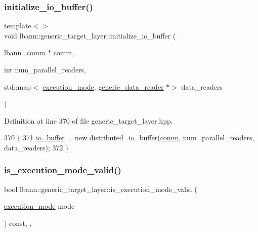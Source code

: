 \subsubsection{\texorpdfstring{initialize\+\_\+io\+\_\+buffer()}{initialize\_io\_buffer()}\hspace{0.1cm}{\footnotesize\ttfamily [3/3]}}
{\footnotesize\ttfamily template$<$$>$ \\
void lbann\+::generic\+\_\+target\+\_\+layer\+::initialize\+\_\+io\+\_\+buffer (\begin{DoxyParamCaption}\item[{\hyperlink{classlbann_1_1lbann__comm}{lbann\+\_\+comm} $\ast$}]{comm,  }\item[{int}]{num\+\_\+parallel\+\_\+readers,  }\item[{std\+::map$<$ \hyperlink{base_8hpp_a2781a159088df64ed7d47cc91c4dc0a8}{execution\+\_\+mode}, \hyperlink{classlbann_1_1generic__data__reader}{generic\+\_\+data\+\_\+reader} $\ast$$>$}]{data\+\_\+readers }\end{DoxyParamCaption})\hspace{0.3cm}{\ttfamily [inline]}}



Definition at line 370 of file generic\+\_\+target\+\_\+layer.\+hpp.


\begin{DoxyCode}
370                                                                                                            
                                                                                          \{
371   \hyperlink{classlbann_1_1generic__target__layer_a8da650b94f50cc63fc90cd792fa50c3f}{io\_buffer} = \textcolor{keyword}{new} distributed\_io\_buffer(\hyperlink{file__io_8cpp_ab048c6f9fcbcfaa57ce68b00263dbebe}{comm}, num\_parallel\_readers, data\_readers);
372 \}
\end{DoxyCode}
\mbox{\label{classlbann_1_1generic__target__layer_a0ae18b3b410c3b6c1a5b34a3547ba4c5}} 
\subsubsection{\texorpdfstring{is\+\_\+execution\+\_\+mode\+\_\+valid()}{is\_execution\_mode\_valid()}}
{\footnotesize\ttfamily bool lbann\+::generic\+\_\+target\+\_\+layer\+::is\+\_\+execution\+\_\+mode\+\_\+valid (\begin{DoxyParamCaption}\item[{\hyperlink{base_8hpp_a2781a159088df64ed7d47cc91c4dc0a8}{execution\+\_\+mode}}]{mode }\end{DoxyParamCaption}) const\hspace{0.3cm}{\ttfamily [inline]}, {\ttfamily [override]}, {\ttfamily [virtual]}}



